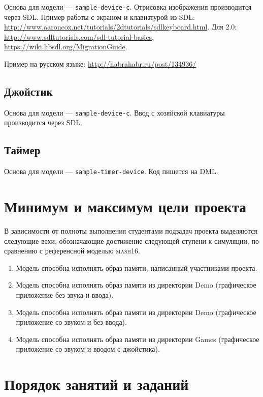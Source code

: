 Основа для модели --- \texttt{sample-device-c}. Отрисовка изображения производится через SDL. Пример работы с экраном и клавиатурой из SDL: \url{http://www.aaroncox.net/tutorials/2dtutorials/sdlkeyboard.html}. Для 2.0: \url{http://www.sdltutorials.com/sdl-tutorial-basics}, \url{https://wiki.libsdl.org/MigrationGuide}.

Пример на русском языке: \url{http://habrahabr.ru/post/134936/}

\subsection{Джойстик}

Основа для модели --- \texttt{sample-device-c}. Ввод с хозяйской клавиатуры производится через SDL.

\subsection{Таймер}

Основа для модели --- \texttt{sample-timer-device}. Код пишется на DML.

\section{Минимум и максимум цели проекта}

В зависимости от полноты выполнения студентами подзадач проекта выделяются следующие вехи, обозначающие достижение следующей ступени к симуляции, по сравнению с референсной моделью \textsc{mash16}.

\begin{enumerate}
    \item Модель способна исполнять образ памяти, написанный участниками проекта.
    \item Модель способна исполнять образ памяти из директории Demo (графическое приложение без звука и ввода).
    \item Модель способна исполнять образ памяти из директории Demo (графическое приложение со звуком и без ввода).
    \item Модель способна исполнять образ памяти из директории Games (графическое приложение со звуком и вводом с джойстика).
\end{enumerate}

\section{Порядок занятий и заданий}

